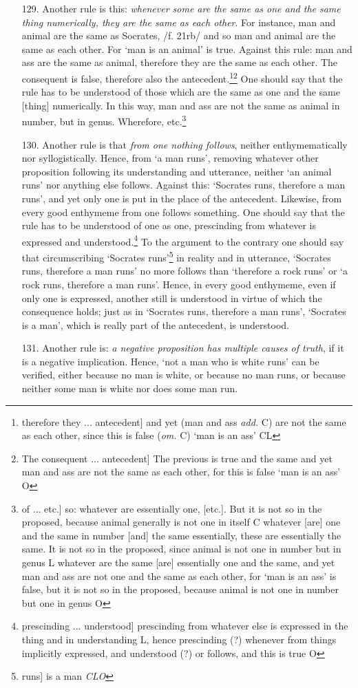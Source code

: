 \begin{itemize}
\item[129.] Another rule is this: \textit{whenever some are the same as one and the same thing numerically, they are the same as each other}. For instance, man and animal are the same as Socrates, /f. 21rb/ and so man and animal are the same as each other. For `man is an animal' is true. Against this rule: man and ass are the same as animal, therefore they are the same as each other. The consequent is false, therefore also the antecedent.\footnote{therefore they ... antecedent] and yet (man and ass \textit{add.} C) are not the same as each other, since this is false (\textit{om.} C) `man is an ass' CL}\footnote{The consequent ... antecedent] The previous is true and the same and yet man and ass are not the same as each other, for this is false `man is an ass' O} One should say that the rule has to be understood of those which are the same as one and the same [thing] numerically. In this way, man and ass are not the same as animal in number, but in genus. Wherefore, etc.\footnote{of ... etc.] so: whatever are essentially one, [etc.]. But it is not so in the proposed, because animal generally is not one in itself C whatever [are] one and the same in number [and] the same essentially, these are essentially the same. It is not so in the proposed, since animal is not one in number but in genus L whatever are the same [are] essentially one and the same, and yet man and ass are not one and the same as each other, for `man is an ass' is false, but it is not so in the proposed, because animal is not one in number but one in genus O}
\item[130.] Another rule is that \textit{from one nothing follows}, neither enthymematically nor syllogistically. Hence, from `a man runs', removing whatever other proposition following its understanding and utterance, neither `an animal runs' nor anything else follows. Against this: `Socrates runs, therefore a man runs', and yet only one is put in the place of the antecedent. Likewise, from every good enthymeme from one follows something. One should say that the rule has to be understood of one as one, prescinding from whatever is expressed and understood.\footnote{prescinding ... understood] prescinding from whatever else is expressed in the thing and in understanding L, hence prescinding (?) whenever from things implicitly expressed, and understood (?) or follows, and this is true O} To the argument to the contrary one should say that circumscribing `Socrates runs'\footnote{runs] is a man \textit{CLO}} in reality and in utterance, `Socrates runs, therefore a man runs' no more follows than `therefore a rock runs' or `a rock runs, therefore a man runs'. Hence, in every good enthymeme, even if only one is expressed, another still is understood in virtue of which the consequence holds; just as in `Socrates runs, therefore a man runs', `Socrates is a man', which is really part of the antecedent, is understood.
\item[131.] Another rule is: \textit{a negative proposition has multiple causes of truth}, if it is a negative implication. Hence, `not a man who is white runs' can be verified, either because no man is white, or because no man runs, or because neither some man is white nor does some man run.
\end{itemize}
